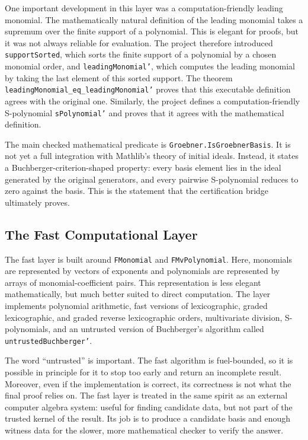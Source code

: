\documentclass[acmsmall,nonacm,screen]{acmart}
\begin{document}
One important development in this layer was a computation-friendly leading monomial.
The mathematically natural definition of the leading monomial takes a supremum over the finite
support of a polynomial.
This is elegant for proofs, but it was not always reliable for evaluation.
The project therefore introduced \texttt{supportSorted}, which sorts the finite support of a
polynomial by a chosen monomial order, and \texttt{leadingMonomial'}, which computes the leading
monomial by taking the last element of this sorted support.
The theorem \texttt{leadingMonomial\_eq\_leadingMonomial'} proves that this executable definition
agrees with the original one.
Similarly, the project defines a computation-friendly S-polynomial \texttt{sPolynomial'} and proves
that it agrees with the mathematical definition.

The main checked mathematical predicate is \texttt{Groebner.IsGroebnerBasis}.
It is not yet a full integration with Mathlib's theory of initial ideals.
Instead, it states a Buchberger-criterion-shaped property: every basis element lies in the ideal
generated by the original generators, and every pairwise S-polynomial reduces to zero against the
basis.
This is the statement that the certification bridge ultimately proves.

\subsection{The Fast Computational Layer}

The fast layer is built around \texttt{FMonomial} and \texttt{FMvPolynomial}.
Here, monomials are represented by vectors of exponents and polynomials are represented by arrays
of monomial-coefficient pairs.
This representation is less elegant mathematically, but much better suited to direct computation.
The layer implements polynomial arithmetic, fast versions of lexicographic, graded lexicographic,
and graded reverse lexicographic orders, multivariate division, S-polynomials, and an untrusted
version of Buchberger's algorithm called \texttt{untrustedBuchberger'}.

The word ``untrusted'' is important.
The fast algorithm is fuel-bounded, so it is possible in principle for it to stop too early and
return an incomplete result.
Moreover, even if the implementation is correct, its correctness is not what the final proof relies
on.
The fast layer is treated in the same spirit as an external computer algebra system: useful for
finding candidate data, but not part of the trusted kernel of the result.
Its job is to produce a candidate basis and enough witness data for the slower, more mathematical
checker to verify the answer.
\end{document}
